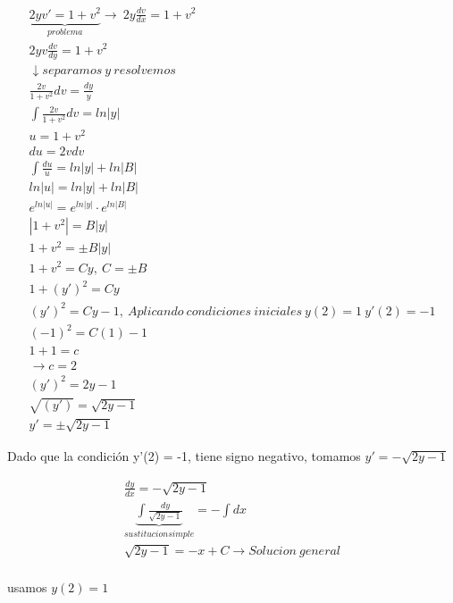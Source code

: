 \documentclass{article}
\begin{document}
\begin{eqnarray}
\nonumber \underbrace{2yv' = 1 + v^2 }_{problema} \rightarrow \ 2y \frac{dv}{dx} = 1+v^2\\
\nonumber 2yv \frac{dv}{dy} = 1+v^2 \\
\nonumber \downarrow separamos \ y \ resolvemos\\
\nonumber \frac{2v}{1+v^2} dv = \frac{dy}{y} \\
\nonumber \int \frac{2v}{1+v^2} dv = ln |y| \\
\nonumber u =1+v^2 \\
\nonumber du = 2vdv \\
\nonumber \int \frac{du}{u} = ln|y| + ln|B| \\
\nonumber ln|u| = ln|y| + ln|B| \\
\nonumber e^{ln|u|} = e^{ln|y|} \cdot e^{ln|B|} \\
\nonumber |1 + v^2| = B |y| \\
\nonumber 1+v^2 = \pm B |y| \\
\nonumber 1+v^2 = Cy , \ C = \pm B \\
\nonumber 1+ (y')^2 = Cy \\
\nonumber (y')^2 = Cy -1 , \ Aplicando \ condiciones \ iniciales \ y(2)=1 \  y'(2) = -1 \\
\nonumber (-1)^2 = C(1)-1 \\
\nonumber 1+1 = c \\
\nonumber \rightarrow c =2 \\
\nonumber (y')^2 = 2y-1 \\
\nonumber \sqrt{(y')} = \sqrt{2y-1}\\
\nonumber y' = \pm \sqrt{2y-1}
\end{eqnarray}

Dado que la condición y'(2) = -1, tiene signo negativo, tomamos $y' = -\sqrt{2y-1}$

\begin{eqnarray}
\nonumber \frac{dy}{dx} = - \sqrt{2y-1}\\
\nonumber \underbrace{\int \frac{dy}{\sqrt{2y-1}} }_{sustitucion simple}  = - \int dx \\
\nonumber \sqrt{2y-1} = -x + C \rightarrow Solucion \ general \\ 
\end{eqnarray}

usamos $y(2) = 1 $ 
\end{document}
